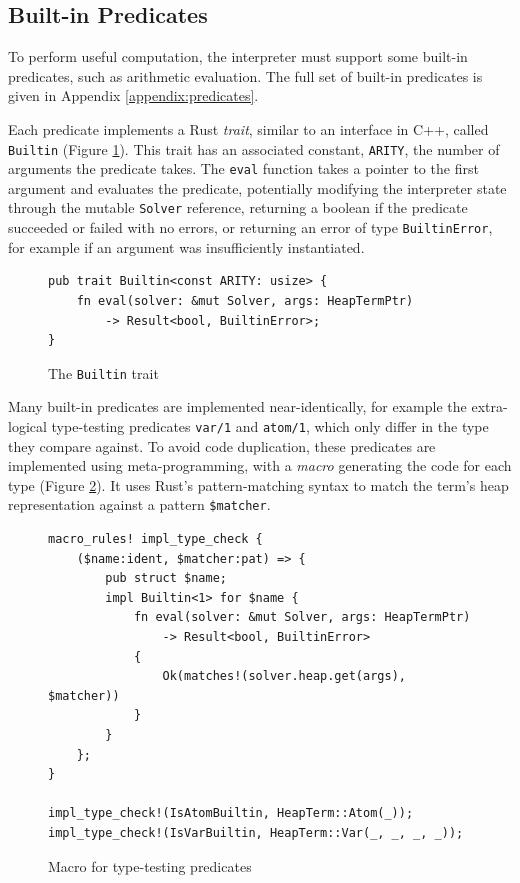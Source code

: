 \subsection{Built-in Predicates}

\label{sec:builtins}

To perform useful computation, the interpreter must support some built-in predicates, such as arithmetic evaluation. The full set of built-in predicates is given in Appendix \ref{appendix:predicates}.

Each predicate implements a Rust \emph{trait}, similar to an interface in C++, called \texttt{Builtin} (Figure \ref{fig:builtin-trait}). This trait has an associated constant, \texttt{ARITY}, the number of arguments the predicate takes. The \texttt{eval} function takes a pointer to the first argument and evaluates the predicate, potentially modifying the interpreter state through the mutable \texttt{Solver} reference, returning a boolean if the predicate succeeded or failed with no errors, or returning an error of type \texttt{BuiltinError}, for example if an argument was insufficiently instantiated.

\begin{figure}[H]
\centering
\begin{verbatim}
pub trait Builtin<const ARITY: usize> {
    fn eval(solver: &mut Solver, args: HeapTermPtr)
        -> Result<bool, BuiltinError>;
}
\end{verbatim}
\caption{The \texttt{Builtin} trait}
\label{fig:builtin-trait}
\end{figure}

Many built-in predicates are implemented near-identically, for example the extra-logical type-testing predicates \texttt{var/1} and \texttt{atom/1}, which only differ in the type they compare against. To avoid code duplication, these predicates are implemented using meta-programming, with a \emph{macro} generating the code for each type (Figure \ref{fig:builtin-macro}). It uses Rust's pattern-matching syntax to match the term's heap representation against a pattern \texttt{\$matcher}.

\begin{figure}[H]
\centering
\begin{verbatim}
macro_rules! impl_type_check {
    ($name:ident, $matcher:pat) => {
        pub struct $name;
        impl Builtin<1> for $name {
            fn eval(solver: &mut Solver, args: HeapTermPtr)
                -> Result<bool, BuiltinError>
            {
                Ok(matches!(solver.heap.get(args), $matcher))
            }
        }
    };
}

impl_type_check!(IsAtomBuiltin, HeapTerm::Atom(_));
impl_type_check!(IsVarBuiltin, HeapTerm::Var(_, _, _, _));
\end{verbatim}
\caption{Macro for type-testing predicates}
\label{fig:builtin-macro}
\end{figure}

